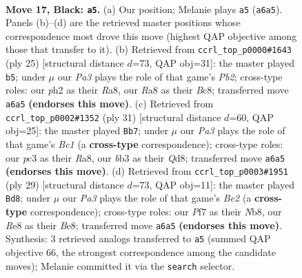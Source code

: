 \documentclass[11pt]{article}
\begin{document}
\clearpage

\begin{figure}[p]\centering
\begin{subfigure}{0.46\textwidth}\centering
\resizebox{\linewidth}{!}{%
\newchessgame
\chessboard[
  setfen={r3r1k1/1bqn1pbp/p5p1/1ppPp1B1/4P3/1BP3PN/P4P1P/R1Q1K2R b - - 0 17},
  showmover=false,
  pgfstyle=straightmove, color=movearrow, markmove={a6-a5}
]}
\caption{}
\end{subfigure}\hfill
\begin{subfigure}{0.46\textwidth}\centering
\resizebox{\linewidth}{!}{%
\newchessgame
\chessboard[
  setfen={r1b2rk1/1pq1bppp/4p3/p1npP3/7P/2P2N2/PPB1QPP1/R1B1K2R b KQ - 1 13},
  showmover=false,
  pgfstyle=straightmove, color=movearrow, markmove={b7-b5}
]}
\caption{}
\end{subfigure}
\\[4pt]
\begin{subfigure}{0.46\textwidth}\centering
\resizebox{\linewidth}{!}{%
\newchessgame
\chessboard[
  setfen={r1bq1r1k/3p2pp/1pn5/p1b2p2/P2p1P2/1B1P4/1PPBN1PP/R3QR1K b - - 1 16},
  showmover=false,
  pgfstyle=straightmove, color=movearrow, markmove={c8-b7}
]}
\caption{}
\end{subfigure}\hfill
\begin{subfigure}{0.46\textwidth}\centering
\resizebox{\linewidth}{!}{%
\newchessgame
\chessboard[
  setfen={rn2brk1/2q1bppp/p2p4/Np1Pp3/1P6/4BP2/P1PQ2PP/1K1R1B1R b - - 2 15},
  showmover=false,
  pgfstyle=straightmove, color=movearrow, markmove={e7-d8}
]}
\caption{}
\end{subfigure}
\caption{\textbf{Move 17, Black: \texttt{a5}.} (a) Our position; Melanie plays \texttt{a5} (\texttt{a6a5}). Panels (b)--(d) are the retrieved master positions whose correspondence most drove this move (highest QAP objective among those that transfer to it). (b) Retrieved from \texttt{ccrl\_top\_p0000\#1643} (ply 25) [structural distance $d$=73, QAP obj=31]: the master played \texttt{b5}; under $\mu$ our \emph{Pa3} plays the role of that game's \emph{Pb2}; cross-type roles: our \emph{p}h2 as their \emph{R}a8, our \emph{R}a8 as their \emph{B}c8; transferred move \texttt{a6a5} \textbf{(endorses this move)}. (c) Retrieved from \texttt{ccrl\_top\_p0002\#1352} (ply 31) [structural distance $d$=60, QAP obj=25]: the master played \texttt{Bb7}; under $\mu$ our \emph{Pa3} plays the role of that game's \emph{Bc1} (a \textbf{cross-type} correspondence); cross-type roles: our \emph{p}c3 as their \emph{R}a8, our \emph{b}b3 as their \emph{Q}d8; transferred move \texttt{a6a5} \textbf{(endorses this move)}. (d) Retrieved from \texttt{ccrl\_top\_p0003\#1951} (ply 29) [structural distance $d$=73, QAP obj=11]: the master played \texttt{Bd8}; under $\mu$ our \emph{Pa3} plays the role of that game's \emph{Be2} (a \textbf{cross-type} correspondence); cross-type roles: our \emph{P}f7 as their \emph{N}b8, our \emph{R}e8 as their \emph{B}e8; transferred move \texttt{a6a5} \textbf{(endorses this move)}. Synthesis: 3 retrieved analogs transferred to \texttt{a5} (summed QAP objective 66, the strongest correspondence among the candidate moves); Melanie committed it via the \texttt{search} selector.}
\label{fig:thought-m33}
\end{figure}
\end{document}
